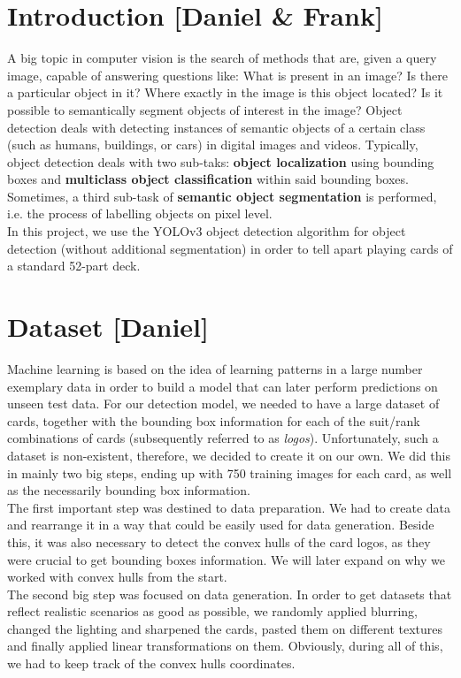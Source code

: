 \documentclass[a4paper]{article}
\begin{document}
\section{Introduction [Daniel \& Frank]}
A big topic in computer vision is the search of methods that are, given a query image, capable of answering questions like: What is present in an image? Is there a particular object in it? Where exactly in the image is this object located? Is it possible to semantically segment objects of interest in the image?
Object detection deals with detecting instances of semantic objects of a certain class (such as humans, buildings, or cars) in digital images and videos. Typically, object detection deals with two sub-taks: \textbf{object localization} using bounding boxes and \textbf{multiclass object classification} within said bounding boxes.
Sometimes, a third sub-task of \textbf{semantic object segmentation} is performed, i.e. the process of labelling objects on pixel level.\\
In this project, we use the YOLOv3 object detection algorithm \cite{DBLP:journals/corr/abs-1804-02767} for object detection (without additional segmentation) in order to tell apart playing cards of a standard 52-part deck.
\newpage
\section{Dataset [Daniel]}
Machine learning is based on the idea of learning patterns in a large number exemplary data in order to build a model that can later perform predictions on unseen test data. For our detection model, we needed to have a large dataset of cards, together with the bounding box information for each of the suit/rank combinations of cards (subsequently referred to as \textit{logos}).  Unfortunately, such a dataset is non-existent, therefore, we decided to create it on our own.  We did this in mainly two big steps, ending up with 750 training images for each card, as well as the necessarily bounding box information.   \\
The first important step was destined to data preparation.  We had to create data and rearrange it in a way that could be easily used for data generation.  Beside this, it was also necessary to detect the convex hulls of the card logos, as they were crucial to get bounding boxes information. We will later expand on why we worked with convex hulls from the start.\\
The second big step was focused on data generation. In order to get datasets that reflect realistic scenarios as good as possible, we randomly applied blurring, changed the lighting and sharpened the cards, pasted them on different textures and finally applied linear transformations on them. Obviously, during all of this, we had to keep track of the convex hulls coordinates. 
\end{document}
